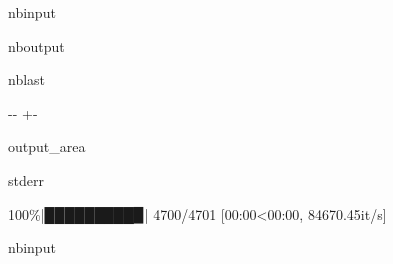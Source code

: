 \documentclass[letterpaper,10pt,english]{sphinxmanual}
\let\sphinxpxdimen\pdfpxdimen\else\newdimen\sphinxpxdimen
\begin{document}
\sphinxAtStartPar
\sphinxincludegraphics[width=550\sphinxpxdimen]{{sysid}.png}





\begin{sphinxuseclass}{nbinput}
{
\begin{sphinxVerbatim}[commandchars=\\\{\}]
\llap{\color{nbsphinxin}[6]:\,\hspace{\fboxrule}\hspace{\fboxsep}}    
\end{sphinxVerbatim}
}

\end{sphinxuseclass}
\begin{sphinxuseclass}{nboutput}
\begin{sphinxuseclass}{nblast}
{

\kern-\sphinxverbatimsmallskipamount\kern-\baselineskip
\kern+\FrameHeightAdjust\kern-\fboxrule
\vspace{\nbsphinxcodecellspacing}

\begin{sphinxuseclass}{output_area}
\begin{sphinxuseclass}{stderr}


\begin{sphinxVerbatim}[commandchars=\\\{\}]
100\%|█████████▉| 4700/4701 [00:00<00:00, 84670.45it/s]
\end{sphinxVerbatim}



\end{sphinxuseclass}
\end{sphinxuseclass}
}

\end{sphinxuseclass}
\end{sphinxuseclass}
\begin{sphinxuseclass}{nbinput}
{
\begin{sphinxVerbatim}[commandchars=\\\{\}]
\llap{\color{nbsphinxin}[7]:\,\hspace{\fboxrule}\hspace{\fboxsep}}
\end{sphinxVerbatim}
}

\end{sphinxuseclass}
\end{document}
